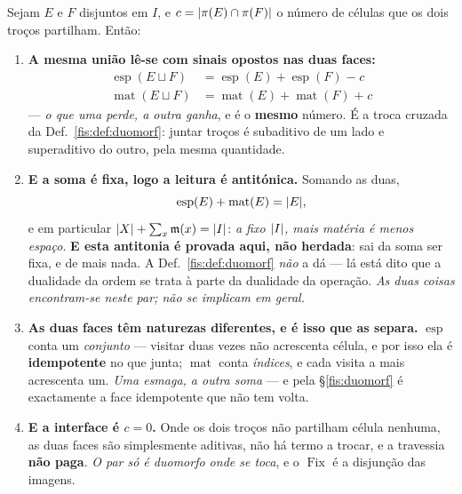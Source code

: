\documentclass[livro.tex]{subfiles}
\begin{document}
\begin{teorema}\label{fis:thm:duoesp}
Sejam $E$ e $F$ disjuntos em $I$, e $c=\lvert \pi(E)\cap\pi(F)\rvert$ o número de
células que os dois troços partilham. Então:
\begin{enumerate}\itemsep3pt
\item[(1)] \textbf{A mesma união lê-se com sinais opostos nas duas faces:}
\[
\boxed{
\begin{aligned}
\operatorname{esp}(E\sqcup F)&=\operatorname{esp}(E)+\operatorname{esp}(F)\;\mathbf{-}\;c\\
\operatorname{mat}(E\sqcup F)&=\operatorname{mat}(E)+\operatorname{mat}(F)\;\mathbf{+}\;c
\end{aligned}}
\]
--- \emph{o que uma perde, a outra ganha}, e é o \textbf{mesmo} número. É a troca
cruzada da Def.~\ref{fis:def:duomorf}: juntar troços é subaditivo de um lado e
superaditivo do outro, pela mesma quantidade.
\item[(2)] \textbf{E a soma é fixa, logo a leitura é antitónica.} Somando as duas,
\[
\operatorname{esp}(E)+\operatorname{mat}(E)=\lvert E\rvert ,
\]
e em particular $\lvert X\rvert+\sum_x\mathfrak{m}(x)=\lvert I\rvert$: \emph{a fixo
$\lvert I\rvert$, mais matéria é menos espaço}. \textbf{E esta antitonia é provada aqui,
não herdada}: sai da soma ser fixa, e de mais nada. A
Def.~\ref{fis:def:duomorf} \emph{não} a dá --- lá está dito que a dualidade da
ordem se trata à parte da dualidade da operação. \emph{As duas coisas encontram-se
neste par; não se implicam em geral.}
\item[(3)] \textbf{As duas faces têm naturezas diferentes, e é isso que as
separa.} $\operatorname{esp}$ conta um \emph{conjunto} --- visitar duas vezes não
acrescenta célula, e por isso ela é \textbf{idempotente} no que junta;
$\operatorname{mat}$ conta \emph{índices}, e cada visita a mais acrescenta um.
\emph{Uma esmaga, a outra soma} --- e pela §\ref{fis:duomorf} é exactamente a
face idempotente que não tem volta.
\item[(4)] \textbf{E a interface é $c=0$.} Onde os dois troços não partilham
célula nenhuma, as duas faces são simplesmente aditivas, não há termo a trocar, e
a travessia \textbf{não paga}. \emph{O par só é duomorfo onde se toca}, e o
$\operatorname{Fix}$ é a disjunção das imagens.
\end{enumerate}
\end{teorema}
\end{document}
